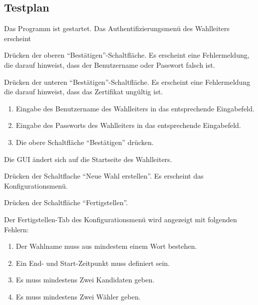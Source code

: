 \documentclass[parskip=full]{scrartcl}
\begin{document}
\subsection{Testplan}
		{Das Programm ist gestartet.}
		{Das Authentifizierungsmenü des Wahlleiters erscheint}

\teststep{}
		{Drücken der oberen \enquote{Bestätigen}-Schaltfläche.}
		{Es erscheint eine Fehlermeldung, die darauf hinweist, dass der Benutzername oder Passwort falsch ist.}

\teststep{}
		{}
		{Drücken der unteren \enquote{Bestätigen}-Schaltfläche.}
		{Es erscheint eine Fehlermeldung die darauf hinweist, dass das Zertifikat ungültig ist.}

\teststep{}
		{\begin{enumerate}
				\item Eingabe des Benutzername des Wahlleiters in das entsprechende Eingabefeld.
				\item Eingabe des Passworts des Wahlleiters in das entsprechende Eingabefeld.
				\item Die obere Schaltfläche \enquote{Bestätigen} drücken.
		\end{enumerate}}
		{Die GUI ändert sich auf die Startseite des Wahlleiters.}
		
\teststep{}
		{Drücken der Schaltflache \enquote{Neue Wahl erstellen}.}
		{Es erscheint das Konfigurationsmenü.}

\teststep{}
		{Drücken der Schaltfläche \enquote{Fertigstellen}.}
		{Der Fertigstellen-Tab des Konfigurationsmenü wird angezeigt mit folgenden Fehlern:
		\begin{enumerate}
			\item Der Wahlname muss aus mindestem einem Wort bestehen.
			\item Ein End- und Start-Zeitpunkt muss definiert sein.
			\item Es muss mindestens Zwei Kandidaten geben.
			\item Es muss mindestens Zwei Wähler geben.
		\end{enumerate}}
\end{document}
